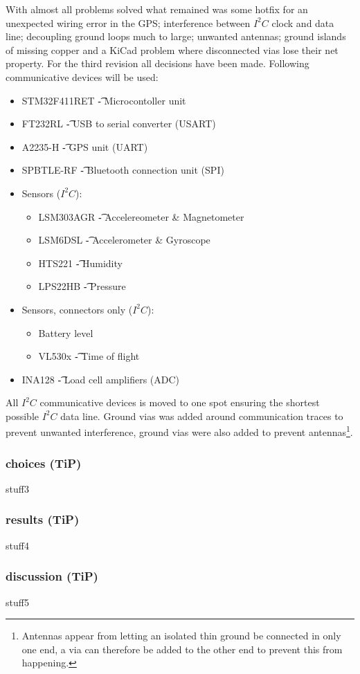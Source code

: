 With almost all problems solved what remained was some hotfix for an unexpected wiring error in the GPS; interference between $I^2C$ clock and data line; decoupling ground loops much to large; unwanted antennas; ground islands of missing copper and  a KiCad problem where disconnected vias lose their net property.
For the third revision all decisions have been made. Following communicative devices will be used:
\begin{itemize}
\item STM32F411RET \t- Microcontoller unit
\item FT232RL \t- USB to serial converter (USART)
\item A2235-H \t- GPS unit (UART)
\item SPBTLE-RF \t- Bluetooth connection unit (SPI)
\item Sensors ($I^2C$):
	\begin{itemize}
		\item LSM303AGR \t- Accelereometer \& Magnetometer
		\item LSM6DSL \t- Accelerometer \& Gyroscope
		\item HTS221 \t- Humidity
		\item LPS22HB \t- Pressure
	\end{itemize}
\item Sensors, connectors only ($I^2C$):
	\begin{itemize}
		\item Battery level
		\item VL530x \t- Time of flight
	\end{itemize}
\item INA128 \t- Load cell amplifiers (ADC)
\end{itemize}
All $I^2C$ communicative devices is moved to one spot ensuring the shortest possible $I^2C$ data line. Ground vias was added around communication traces to prevent unwanted interference, ground vias were also added to prevent antennas\footnote{Antennas appear from letting an isolated thin ground be connected in only one end, a via can therefore be added to the other end to prevent this from happening.}.

\subsubsection{choices (TiP)}
stuff3

\subsubsection{results (TiP)}
stuff4

\subsubsection{discussion (TiP)}
stuff5